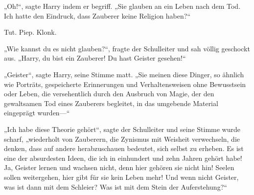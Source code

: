 „Oh!“, sagte Harry indem er begriff. „Sie glauben an ein Leben nach dem Tod. Ich hatte den Eindruck, dass Zauberer keine Religion haben?“

\later

Tut. Piep. Klonk.

„Wie kannst du es nicht glauben?“, fragte der Schulleiter und sah völlig geschockt aus. „Harry, du bist ein Zauberer! Du hast Geister gesehen!“

„Geister“, sagte Harry, seine Stimme matt. „Sie meinen diese Dinger, so ähnlich wie Porträts, gespeicherte Erinnerungen und Verhaltensweisen ohne Bewusstsein oder Leben, die versehentlich durch den Ausbruch von Magie, der den gewaltsamen Tod eines Zauberers begleitet, in das umgebende Material eingeprägt wurden—“

„Ich habe diese Theorie gehört“, sagte der Schulleiter und seine Stimme wurde scharf, „wiederholt von Zauberern, die Zynismus mit Weisheit verwechseln, die denken, dass auf andere herabzuschauen bedeutet, sich selbst zu erheben. Es ist eine der absurdesten Ideen, die ich in einhundert und zehn Jahren gehört habe! Ja, Geister lernen und wachsen nicht, denn hier gehören sie nicht hin! Seelen sollen weitergehen, hier gibt für sie kein Leben mehr! Und wenn nicht Geister, was ist dann mit dem Schleier? Was ist mit dem Stein der Auferstehung?“

